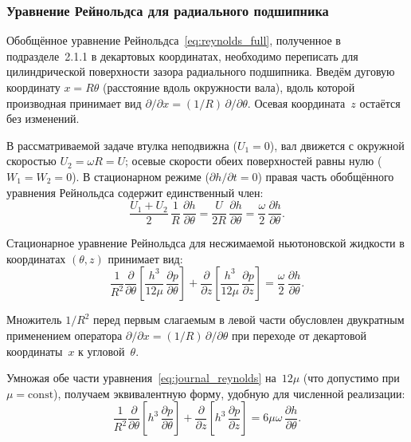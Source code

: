 \subsubsection*{Уравнение Рейнольдса для радиального подшипника}

Обобщённое уравнение Рейнольдса~\eqref{eq:reynolds_full}, полученное в подразделе~2.1.1 в декартовых координатах, необходимо переписать для цилиндрической поверхности зазора радиального подшипника. Введём дуговую координату $x = R\theta$ (расстояние вдоль окружности вала), вдоль которой производная принимает вид $\partial/\partial x = (1/R)\,\partial/\partial\theta$. Осевая координата~$z$ остаётся без изменений.

В рассматриваемой задаче втулка неподвижна ($U_1 = 0$), вал движется с окружной скоростью $U_2 = \omega R = U$; осевые скорости обеих поверхностей равны нулю ($W_1 = W_2 = 0$). В стационарном режиме ($\partial h/\partial t = 0$) правая часть обобщённого уравнения Рейнольдса содержит единственный член:
\begin{equation}
\frac{U_1 + U_2}{2}\,\frac{1}{R}\,\frac{\partial h}{\partial \theta} = \frac{U}{2R}\,\frac{\partial h}{\partial \theta} = \frac{\omega}{2}\,\frac{\partial h}{\partial \theta}.
\label{eq:journal_rhs_derivation}
\end{equation}

Стационарное уравнение Рейнольдса для несжимаемой ньютоновской жидкости в координатах $(\theta, z)$ принимает вид:
\begin{equation}
\frac{1}{R^2}\frac{\partial}{\partial \theta}\!\left[\frac{h^3}{12\mu}\,\frac{\partial p}{\partial \theta}\right] + \frac{\partial}{\partial z}\!\left[\frac{h^3}{12\mu}\,\frac{\partial p}{\partial z}\right] = \frac{\omega}{2}\,\frac{\partial h}{\partial \theta}.
\label{eq:journal_reynolds}
\end{equation}

Множитель $1/R^2$ перед первым слагаемым в левой части обусловлен двукратным применением оператора $\partial/\partial x = (1/R)\,\partial/\partial\theta$ при переходе от декартовой координаты~$x$ к угловой~$\theta$.

Умножая обе части уравнения~\eqref{eq:journal_reynolds} на~$12\mu$ (что допустимо при $\mu = \mathrm{const}$), получаем эквивалентную форму, удобную для численной реализации:
\begin{equation}
\frac{1}{R^2}\frac{\partial}{\partial \theta}\!\left[h^3\,\frac{\partial p}{\partial \theta}\right] + \frac{\partial}{\partial z}\!\left[h^3\,\frac{\partial p}{\partial z}\right] = 6\mu\omega\,\frac{\partial h}{\partial \theta}.
\label{eq:journal_reynolds_num}
\end{equation}

